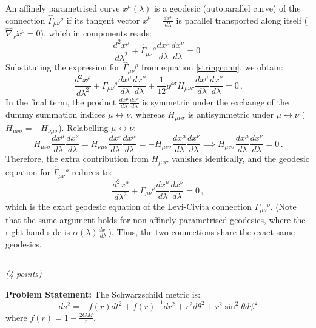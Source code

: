 \documentclass[12pt]{article}
\newcommand{\be}{\begin{equation}}
\newcommand{\ee}{\end{equation}}
\newcounter{quesno}
\newcommand{\ques}[1]{\vspace{2em}\stepcounter{quesno}
\noindent{\bf Question \thequesno.} \emph{(#1 points)\\}
}
\begin{document}
\begin{enumerate}[label=\alph*)]
An affinely parametrised curve $x^\mu(\lambda)$ is a geodesic (autoparallel curve) of the connection $\hat\Gamma_{\mu\nu}{}^\rho$ if its tangent vector $\dot{x}^\mu = \frac{dx^\mu}{d\lambda}$ is parallel transported along itself ($\hat\nabla_{\dot{x}} \dot{x}^\rho = 0$), which in components reads:
\be
\frac{d^2 x^\rho}{d\lambda^2} + \hat\Gamma_{\mu\nu}{}^\rho \frac{dx^\mu}{d\lambda} \frac{dx^\nu}{d\lambda} = 0 \,.
\ee
Substituting the expression for $\hat\Gamma_{\mu\nu}{}^\rho$ from equation \eqref{stringconn}, we obtain:
\be
\frac{d^2 x^\rho}{d\lambda^2} + \Gamma_{\mu\nu}{}^\rho \frac{dx^\mu}{d\lambda} \frac{dx^\nu}{d\lambda} + \frac{1}{12} g^{\rho\sigma} H_{\mu\nu\sigma} \frac{dx^\mu}{d\lambda} \frac{dx^\nu}{d\lambda} = 0 \,.
\ee
In the final term, the product $\frac{dx^\mu}{d\lambda} \frac{dx^\nu}{d\lambda}$ is symmetric under the exchange of the dummy summation indices $\mu \leftrightarrow \nu$, whereas $H_{\mu\nu\sigma}$ is antisymmetric under $\mu \leftrightarrow \nu$ ($H_{\mu\nu\sigma} = -H_{\nu\mu\sigma}$). Relabelling $\mu \leftrightarrow \nu$:
\be
H_{\mu\nu\sigma} \frac{dx^\mu}{d\lambda} \frac{dx^\nu}{d\lambda} = H_{\nu\mu\sigma} \frac{dx^\nu}{d\lambda} \frac{dx^\mu}{d\lambda} = - H_{\mu\nu\sigma} \frac{dx^\mu}{d\lambda} \frac{dx^\nu}{d\lambda} \implies H_{\mu\nu\sigma} \frac{dx^\mu}{d\lambda} \frac{dx^\nu}{d\lambda} = 0 \,.
\ee
Therefore, the extra contribution from $H_{\mu\nu\sigma}$ vanishes identically, and the geodesic equation for $\hat\Gamma_{\mu\nu}{}^\rho$ reduces to:
\be
\frac{d^2 x^\rho}{d\lambda^2} + \Gamma_{\mu\nu}{}^\rho \frac{dx^\mu}{d\lambda} \frac{dx^\nu}{d\lambda} = 0 \,,
\ee
which is the exact geodesic equation of the Levi-Civita connection $\Gamma_{\mu\nu}{}^\rho$. (Note that the same argument holds for non-affinely parametrised geodesics, where the right-hand side is $\alpha(\lambda)\frac{dx^\rho}{d\lambda}$). Thus, the two connections share the exact same geodesics.
\end{enumerate}

\vspace{1em}
\hrule

\ques{4}
\textbf{Problem Statement:} The Schwarzschild metric is:
\be
ds^2 = - f(r) dt^2 + f(r)^{-1} dr^2 + r^2 d \theta^2 + r^2 \sin^2 \theta d\phi^2 
\ee
where $f(r) = 1 - \frac{2GM}{r}$. 
\end{document}
